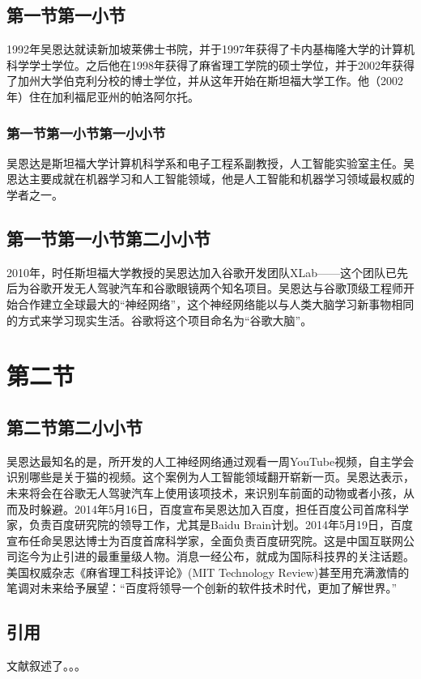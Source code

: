 \documentclass[a4paper, 12pt, centering]{article}
\begin{document}
\subsection{第一节第一小节}
1992年吴恩达就读新加坡莱佛士书院，并于1997年获得了卡内基梅隆大学的计算机科学学士学位。之后他在1998年获得了麻省理工学院的硕士学位，并于2002年获得了加州大学伯克利分校的博士学位，并从这年开始在斯坦福大学工作。他（2002年）住在加利福尼亚州的帕洛阿尔托。

\subsubsection{第一节第一小节第一小小节}

吴恩达是斯坦福大学计算机科学系和电子工程系副教授，人工智能实验室主任。吴恩达主要成就在机器学习和人工智能领域，他是人工智能和机器学习领域最权威的学者之一。

\subsection{第一节第一小节第二小小节}
2010年，时任斯坦福大学教授的吴恩达加入谷歌开发团队XLab——这个团队已先后为谷歌开发无人驾驶汽车和谷歌眼镜两个知名项目。吴恩达与谷歌顶级工程师开始合作建立全球最大的“神经网络”，这个神经网络能以与人类大脑学习新事物相同的方式来学习现实生活。谷歌将这个项目命名为“谷歌大脑”。

\section{第二节}
\subsection{第二节第二小小节}
吴恩达最知名的是，所开发的人工神经网络通过观看一周YouTube视频，自主学会识别哪些是关于猫的视频。这个案例为人工智能领域翻开崭新一页。吴恩达表示，未来将会在谷歌无人驾驶汽车上使用该项技术，来识别车前面的动物或者小孩，从而及时躲避。2014年5月16日，百度宣布吴恩达加入百度，担任百度公司首席科学家，负责百度研究院的领导工作，尤其是Baidu Brain计划。2014年5月19日，百度宣布任命吴恩达博士为百度首席科学家，全面负责百度研究院。这是中国互联网公司迄今为止引进的最重量级人物。消息一经公布，就成为国际科技界的关注话题。美国权威杂志《麻省理工科技评论》(MIT Technology Review)甚至用充满激情的笔调对未来给予展望：“百度将领导一个创新的软件技术时代，更加了解世界。”

\subsection{引用}
文献\cite{1}\cite{2}叙述了。。。
\end{document}

